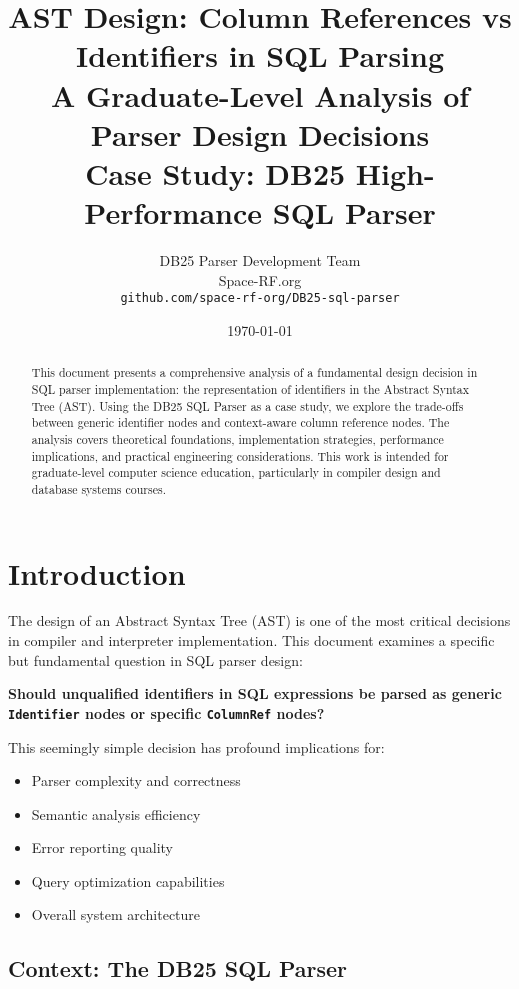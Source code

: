 \documentclass[11pt,a4paper]{article}
\title{\textbf{AST Design: Column References vs Identifiers in SQL Parsing}\\
\large A Graduate-Level Analysis of Parser Design Decisions\\[0.5em]
\large Case Study: DB25 High-Performance SQL Parser}
\author{DB25 Parser Development Team\\
Space-RF.org\\
\texttt{github.com/space-rf-org/DB25-sql-parser}}
\date{\today}
\begin{document}
\maketitle

\begin{abstract}
This document presents a comprehensive analysis of a fundamental design decision in SQL parser implementation: the representation of identifiers in the Abstract Syntax Tree (AST). Using the DB25 SQL Parser as a case study, we explore the trade-offs between generic identifier nodes and context-aware column reference nodes. The analysis covers theoretical foundations, implementation strategies, performance implications, and practical engineering considerations. This work is intended for graduate-level computer science education, particularly in compiler design and database systems courses.
\end{abstract}

\tableofcontents
\newpage

\section{Introduction}

The design of an Abstract Syntax Tree (AST) is one of the most critical decisions in compiler and interpreter implementation. This document examines a specific but fundamental question in SQL parser design:

\begin{tcolorbox}[colback=blue!5!white,colframe=blue!75!black,title=\emoji{thinking-face} The Central Question]
\textbf{Should unqualified identifiers in SQL expressions be parsed as generic \texttt{Identifier} nodes or specific \texttt{ColumnRef} nodes?}
\end{tcolorbox}

This seemingly simple decision has profound implications for:
\begin{itemize}
    \item {} Parser complexity and correctness
    \item {} Semantic analysis efficiency
    \item {} Error reporting quality
    \item {} Query optimization capabilities
    \item {} Overall system architecture
\end{itemize}

\subsection{Context: The DB25 SQL Parser}
\end{document}
